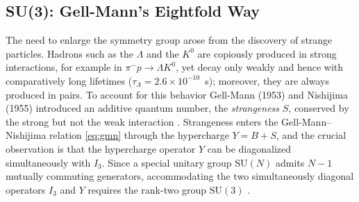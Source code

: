 \subsection{SU(3): Gell-Mann's Eightfold Way}
\label{subsec:su3}

The need to enlarge the symmetry group arose from the discovery of strange
particles. Hadrons such as the $\Lambda$ and the $K^0$ are copiously produced in
strong interactions, for example in $\pi^- p \to \Lambda K^0$, yet decay only weakly
and hence with comparatively long lifetimes ($\tau_\Lambda = 2.6 \times
10^{-10}$~s); moreover, they are always produced in pairs. To account for this
behavior Gell-Mann (1953) and Nishijima (1955) introduced an additive quantum
number, the \emph{strangeness} $S$, conserved by the strong but not the weak
interaction \cite[Ch.~1]{Amsler2018}. Strangeness enters the Gell-Mann--Nishijima
relation \eqref{eq:gmn} through the hypercharge $Y = B + S$, and the crucial
observation is that the hypercharge operator $Y$ can be diagonalized simultaneously
with $I_3$. Since a special unitary group $\mathrm{SU}(N)$ admits $N-1$ mutually
commuting generators, accommodating the two simultaneously diagonal operators $I_3$
and $Y$ requires the rank-two group $\mathrm{SU}(3)$ \cite[Ch.~7]{Amsler2018}.

